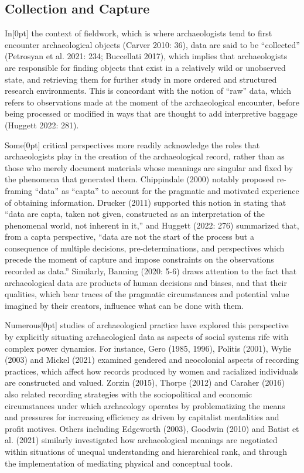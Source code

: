 \documentclass[
]{article}
\newcommand{\paragraphnumber}[1]{\marginnote{\color{lightgray}\tiny{#1}}[0pt]}
\begin{document}
\subsection{Collection and Capture}\label{collection-and-capture}

In\paragraphnumber{[6]} the context of fieldwork, which is where
archaeologists tend to first encounter archaeological objects (Carver
2010: 36), data are said to be ``collected'' (Petrosyan et al. 2021:
234; Buccellati 2017), which implies that archaeologists are responsible
for finding objects that exist in a relatively wild or unobserved state,
and retrieving them for further study in more ordered and structured
research environments. This is concordant with the notion of ``raw''
data, which refers to observations made at the moment of the
archaeological encounter, before being processed or modified in ways
that are thought to add interpretive baggage (Huggett 2022: 281).

Some\paragraphnumber{[7]} critical perspectives more readily acknowledge
the roles that archaeologists play in the creation of the archaeological
record, rather than as those who merely document materials whose
meanings are singular and fixed by the phenomena that generated them.
Chippindale (2000) notably proposed re-framing ``data'' as ``capta'' to
account for the pragmatic and motivated experience of obtaining
information. Drucker (2011) supported this notion in stating that ``data
are capta, taken not given, constructed as an interpretation of the
phenomenal world, not inherent in it,'' and Huggett (2022: 276)
summarized that, from a capta perspective, ``data are not the start of
the process but a consequence of multiple decisions, pre-determinations,
and perspectives which precede the moment of capture and impose
constraints on the observations recorded as data.'' Similarly, Banning
(2020: 5-6) draws attention to the fact that archaeological data are
products of human decisions and biases, and that their qualities, which
bear traces of the pragmatic circumstances and potential value imagined
by their creators, influence what can be done with them.

Numerous\paragraphnumber{[8]} studies of archaeological practice have
explored this perspective by explicitly situating archaeological data as
aspects of social systems rife with complex power dynamics. For
instance, Gero (1985, 1996), Politis (2001), Wylie (2003) and Mickel
(2021) examined gendered and neocolonial aspects of recording practices,
which affect how records produced by women and racialized individuals
are constructed and valued. Zorzin (2015), Thorpe (2012) and Caraher
(2016) also related recording strategies with the sociopolitical and
economic circumstances under which archaeology operates by
problematizing the means and pressures for increasing efficiency as
driven by capitalist mentalities and profit motives. Others including
Edgeworth (2003), Goodwin (2010) and Batist et al. (2021) similarly
investigated how archaeological meanings are negotiated within
situations of unequal understanding and hierarchical rank, and through
the implementation of mediating physical and conceptual tools.
\end{document}
